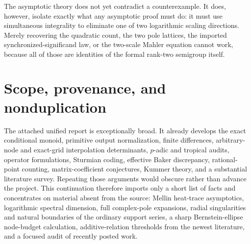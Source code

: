 \documentclass[11pt,oneside]{article}
\theoremstyle{definition}
\theoremstyle{remark}
\begin{document}
\begin{abstract}
The July--August 2026 literature is also assessed, especially Harrison's additive-relations theorem for irrational powers, Nguyen's refined Diophantine exponent, recent multivariate Mahler theory, and a Gaussian-integer Cobham theorem.  These advances sharpen interfaces and suggest precise threshold problems, but none currently removes the same rank-two-to-rank-one obstruction.  No complete proof of the conjecture is claimed.  The principal contribution is a new, rigorous asymptotic dictionary, several exact conditional expansions and equivalences, a sharp approximation barrier, and a prioritized set of narrower research targets.
\end{abstract}

\begin{resultbox}
The asymptotic theory does not yet contradict a counterexample.  It does, however, isolate exactly what any asymptotic proof must do: it must use simultaneous integrality to eliminate one of two logarithmic scaling directions.  Merely recovering the quadratic count, the two pole lattices, the imported synchronized-significand law, or the two-scale Mahler equation cannot work, because all of those are identities of the formal rank-two semigroup itself.
\end{resultbox}

\tableofcontents
\newpage

\section{Scope, provenance, and nonduplication}

The attached unified report is exceptionally broad.  It already develops the exact conditional monoid, primitive output normalization, finite differences, arbitrary-node and exact-grid interpolation determinants, $p$-adic and tropical audits, operator formulations, Sturmian coding, effective Baker discrepancy, rational-point counting, matrix-coefficient conjectures, Kummer theory, and a substantial literature survey.  Repeating those arguments would obscure rather than advance the project.  This continuation therefore imports only a short list of facts and concentrates on material absent from the source: Mellin heat-trace asymptotics, logarithmic spectral dimension, full complex-pole expansions, radial singularities and natural boundaries of the ordinary support series, a sharp Bernstein-ellipse node-budget calculation, additive-relation thresholds from the newest literature, and a focused audit of recently posted work.
\end{document}
